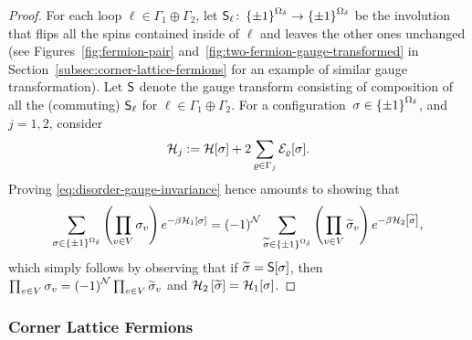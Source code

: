 \documentclass[12pt,oneside,english]{amsart}
\numberwithin{equation}{section}
\numberwithin{figure}{section}
\theoremstyle{plain}
\theoremstyle{plain}
\theoremstyle{plain}
\theoremstyle{plain}
\theoremstyle{remark}
\theoremstyle{definition}
\theoremstyle{plain}
\theoremstyle{plain}
\numberwithin{thm}{section}
\begin{document}
\begin{proof}
For each loop $\ell\in\Gamma_{1}\oplus\Gamma_{2}$, let 
$\mathsf{S}_{\ell} \colon 
    \left\{  \pm 1  \right\}^{{{\Omega}}_{{\delta}}} \to \left\{  \pm 1  \right\}^{{{\Omega}}_{{\delta}}}$
be the involution that flips all the spins contained inside of $\ell$
and leaves the other ones unchanged (see Figures~\ref{fig:fermion-pair}
and~\ref{fig:two-fermion-gauge-transformed} in 
Section~\ref{subsec:corner-lattice-fermions}
for an example of similar gauge transformation). Let $\mathsf{S}$
denote the gauge transform consisting of composition of all the (commuting)
$\mathsf{S}_{\ell}$ for $\ell\in\Gamma_{1}\oplus\Gamma_{2}$. For
a configuration~${{\sigma} \in \left\{  \pm 1  \right\}^{{{\Omega}}_{{\delta}}}}$, and $j=1,2$,
consider
\[
\mathcal{H}_{j} :=
  \mathcal{H}[{\sigma}] 
  + 2 \sum_{{\varrho}\in\Gamma_{j}} {\mathcal{E}}_{{\varrho}}[{\sigma}] .
\]
Proving \eqref{eq:disorder-gauge-invariance} hence amounts to showing
that 
\[
\sum_{{\sigma} \in \left\{  \pm 1  \right\}^{{{\Omega}}_{{\delta}} }}
  \left( \prod_{v\in V} {\sigma}_{v}\right)
  e^{-{{\beta}} \mathcal{H}_{1}[{\sigma}] }
= \left(-1\right)^{\mathcal{N}}
  \sum_{\widetilde{{\sigma}} \in\left\{  \pm 1  \right\}^{{{\Omega}}_{{\delta}} }}
  \left(\prod_{v\in V}\widetilde{{\sigma}}_{v}\right)
  e^{-{{\beta}} \mathcal{H}_{2}\left[\widetilde{{\sigma}}\right]} ,
\]
which simply follows by observing that if 
$\widetilde{{\sigma}}=\mathsf{S}[{\sigma}] $,
then $\prod_{v\in V}{\sigma}_{v} = 
\left(-1\right)^{\mathcal{N}}\prod_{v \in V}\widetilde{{\sigma}}_{v}$
and $\mathcal{H}_{2}\left[\widetilde{{\sigma}}\right] = \mathcal{H}_{1}[{\sigma}] $. 
\end{proof}

\subsubsection{\label{subsec:corner-lattice-fermions}Corner Lattice Fermions}
\end{document}
